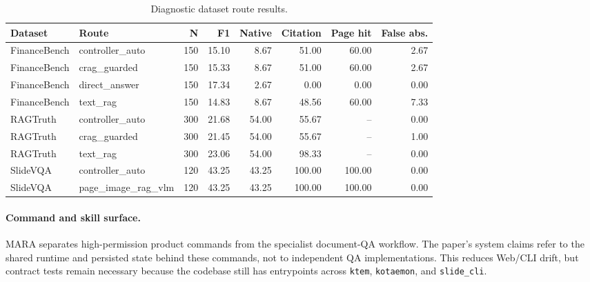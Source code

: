 \begin{table}[t]
\centering
\small
\setlength{\tabcolsep}{4pt}
\begin{tabular}{llrrrrrr}
\toprule
\rowcolor{gray!10}
Dataset & Route & N & F1 & Native & Citation & Page hit & False abs. \\
\midrule
FinanceBench & controller\_auto & 150 & 15.10 & 8.67 & 51.00 & 60.00 & 2.67 \\
FinanceBench & crag\_guarded & 150 & 15.33 & 8.67 & 51.00 & 60.00 & 2.67 \\
FinanceBench & direct\_answer & 150 & 17.34 & 2.67 & 0.00 & 0.00 & 0.00 \\
FinanceBench & text\_rag & 150 & 14.83 & 8.67 & 48.56 & 60.00 & 7.33 \\
\midrule
RAGTruth & controller\_auto & 300 & 21.68 & 54.00 & 55.67 & -- & 0.00 \\
RAGTruth & crag\_guarded & 300 & 21.45 & 54.00 & 55.67 & -- & 1.00 \\
RAGTruth & text\_rag & 300 & 23.06 & 54.00 & 98.33 & -- & 0.00 \\
\midrule
SlideVQA & controller\_auto & 120 & 43.25 & 43.25 & 100.00 & 100.00 & 0.00 \\
SlideVQA & page\_image\_rag\_vlm & 120 & 43.25 & 43.25 & 100.00 & 100.00 & 0.00 \\
\bottomrule
\end{tabular}
\caption{Diagnostic dataset route results.}
\label{tab:appendix-diagnostic-results}
\end{table}

\paragraph{Command and skill surface.}

MARA separates high-permission product commands from the specialist document-QA workflow. The paper's system claims refer to the shared runtime and persisted state behind these commands, not to independent QA implementations. This reduces Web/CLI drift, but contract tests remain necessary because the codebase still has entrypoints across \texttt{ktem}, \texttt{kotaemon}, and \texttt{slide\_cli}.

